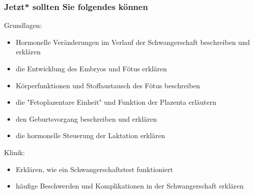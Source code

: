 \documentclass{beamer}
\begin{document}
\begin{frame}

 \frametitle{Jetzt* sollten Sie folgendes können}



\begin{block}{Grundlagen:}
\begin{itemize}
\item
Hormonelle Veränderungen im Verlauf der Schwangerschaft beschreiben und erklären
\item
die Entwicklung des Embryos und Fötus erklären 
\item
Körperfunktionen und Stoffaustausch des Fötus beschreiben
\item
die "Fetoplazentare Einheit" und Funktion der Plazenta erläutern
\item
den Geburtsvorgang beschreiben und erklären
\item
die hormonelle Steuerung der Laktation erklären

\end{itemize}

\end{block}



\begin{block}{Klinik:}
\begin{itemize}
\item
Erklären, wie ein Schwangerschaftstest funktioniert
\item
häufige Beschwerden und Komplikationen in der Schwangerschaft erklären

\end{itemize}

\end{block}

\end{frame}





\end{document}
